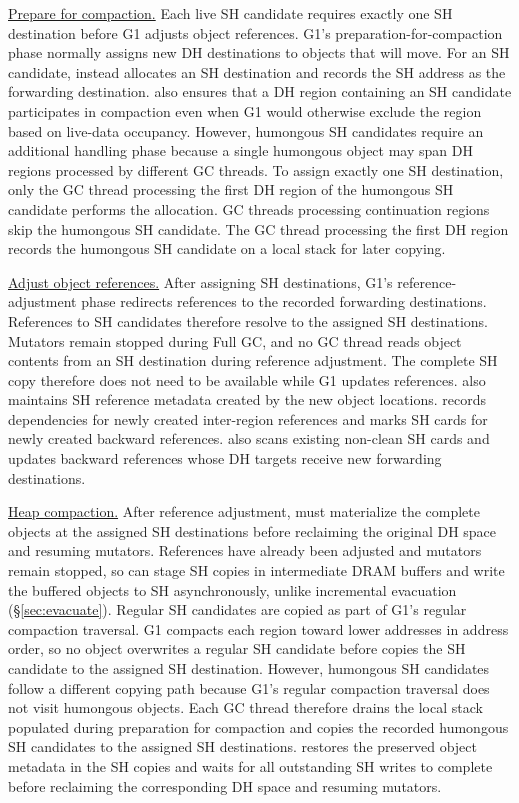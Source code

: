 \underline{Prepare for compaction.}
Each live SH candidate requires exactly one SH destination before G1 adjusts object references.
G1's preparation-for-compaction phase normally assigns new DH destinations to objects that will move.
For an SH candidate, \chipperName{} instead allocates an SH destination and records the SH address as the forwarding destination.
\chipperName{} also ensures that a DH region containing an SH candidate participates in compaction even when G1 would otherwise exclude the region based on live-data occupancy.
However, humongous SH candidates require an additional handling phase because a single humongous object may span DH regions processed by different GC threads.
To assign exactly one SH destination, only the GC thread processing the first DH region of the humongous SH candidate performs the allocation.
GC threads processing continuation regions skip the humongous SH candidate.
The GC thread processing the first DH region records the humongous SH candidate on a local stack for later copying.

\underline{Adjust object references.}
After assigning SH destinations, G1's reference-adjustment phase redirects references to the recorded forwarding destinations.
References to SH candidates therefore resolve to the assigned SH destinations.
Mutators remain stopped during Full GC, and no GC thread reads object contents from an SH destination during reference adjustment.
The complete SH copy therefore does not need to be available while G1 updates references.
\chipperName{} also maintains SH reference metadata created by the new object locations.
\chipperName{} records dependencies for newly created inter-region references and marks SH cards for newly created backward references.
\chipperName{} also scans existing non-clean SH cards and updates backward references whose DH targets receive new forwarding destinations.

\underline{Heap compaction.}
After reference adjustment, \chipperName{} must materialize the complete objects at the assigned SH destinations before reclaiming the original DH space and resuming mutators.
References have already been adjusted and mutators remain stopped, so \chipperName{} can stage SH copies in intermediate DRAM buffers and write the buffered objects to SH asynchronously, unlike incremental evacuation (\S\ref{sec:evacuate}).
Regular SH candidates are copied as part of G1's regular compaction traversal.
G1 compacts each region toward lower addresses in address order, so no object overwrites a regular SH candidate before \chipperName{} copies the SH candidate to the assigned SH destination.
However, humongous SH candidates follow a different copying path because G1's regular compaction traversal does not visit humongous objects.
Each GC thread therefore drains the local stack populated during preparation for compaction and copies the recorded humongous SH candidates to the assigned SH destinations.
\chipperName{} restores the preserved object metadata in the SH copies and waits for all outstanding SH writes to complete before reclaiming the corresponding DH space and resuming mutators.
